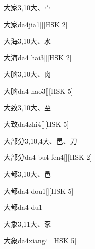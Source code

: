 \begin{entry}{大家}{3,10}{⼤、⼧}
  \begin{phonetics}{大家}{da4jia1}[][HSK 2]
  \end{phonetics}
\end{entry}

\begin{entry}{大海}{3,10}{⼤、⽔}
  \begin{phonetics}{大海}{da4 hai3}[][HSK 2]
  \end{phonetics}
\end{entry}

\begin{entry}{大脑}{3,10}{⼤、⾁}
  \begin{phonetics}{大脑}{da4 nao3}[][HSK 5]
  \end{phonetics}
\end{entry}

\begin{entry}{大致}{3,10}{⼤、⾄}
  \begin{phonetics}{大致}{da4zhi4}[][HSK 5]
  \end{phonetics}
\end{entry}

\begin{entry}{大部分}{3,10,4}{⼤、⾢、⼑}
  \begin{phonetics}{大部分}{da4 bu4 fen4}[][HSK 2]
  \end{phonetics}
\end{entry}

\begin{entry}{大都}{3,10}{⼤、⾢}
  \begin{phonetics}{大都}{da4 dou1}[][HSK 5]
  \end{phonetics}
  \begin{phonetics}{大都}{da4 du1}
  \end{phonetics}
\end{entry}

\begin{entry}{大象}{3,11}{⼤、⾗}
  \begin{phonetics}{大象}{da4xiang4}[][HSK 5]
  \end{phonetics}
\end{entry}

